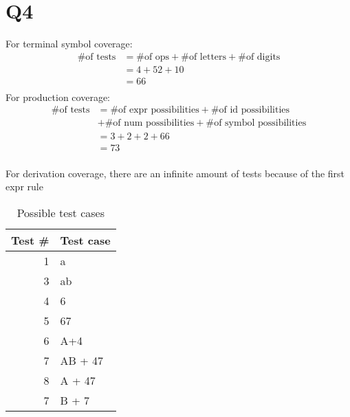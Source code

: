 \documentclass[12pt, letterpaper, titlepage]{article}
\begin{document}
\section{Q4}
For terminal symbol coverage:
\begin{align}
    \text{\# of tests} &= \text{\# of ops} + \text{\# of letters} + \text{\# of digits} \\
    &= 4 + 52 + 10 \\
    &= 66 \\
\end{align}
For production coverage:
\begin{align}
    \text{\# of tests} &= \text{\# of expr possibilities} + \text{\# of id possibilities} \\ 
    &+ \text{\# of num possibilities} + \text{\# of symbol possibilities}\\
    &= 3 + 2 + 2 + 66 \\
    &= 73 \\
\end{align}

For derivation coverage, there are an infinite amount of tests because of the first expr rule

\begin{table}[H]
    \centering
    \caption{Possible test cases}
    \begin{tabular}{|r|l|}
    \hline
    \multicolumn{1}{|l|}{Test \#} & Test case               \\ \hline
    1                             & a                       \\ \hline
    3                             & ab                      \\ \hline
    4                             & 6  \\ \hline
    5                             & 67 \\ \hline
    6                             & A+4                     \\ \hline
    7                             & AB + 47                 \\ \hline    8                             & A + 47                 \\ \hline
    7                             & B + 7                 \\ \hline
    \end{tabular}
    \end{table}
\end{document}
